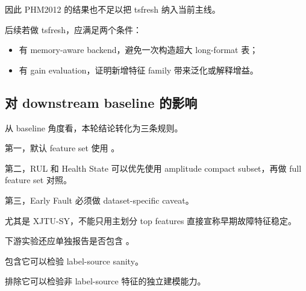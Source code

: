 因此 PHM2012 的结果也不足以把 tsfresh 纳入当前主线。

后续若做 tsfresh，应满足两个条件：

\begin{itemize}[leftmargin=2em]
  \item 有 memory-aware backend，避免一次构造超大 long-format 表；
  \item 有 gain evaluation，证明新增特征 family 带来泛化或解释增益。
\end{itemize}

\subsection{对 downstream baseline 的影响}



从 baseline 角度看，本轮结论转化为三条规则。

第一，默认 feature set 使用 。

第二，RUL 和 Health State 可以优先使用 amplitude compact subset，再做 full feature set 对照。

第三，Early Fault 必须做 dataset-specific caveat。

尤其是 XJTU-SY，不能只用主划分 top features 直接宣称早期故障特征稳定。

下游实验还应单独报告是否包含 。

包含它可以检验 label-source sanity。

排除它可以检验非 label-source 特征的独立建模能力。
